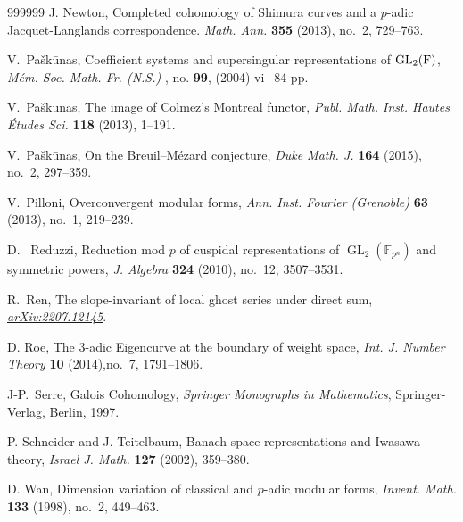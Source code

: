 \documentclass[12pt]{amsart}
\theoremstyle{definition}
\numberwithin{equation}{subsection}
\def\FF{\mathbb{F}}
\DeclareMathOperator{\GL}{GL}
\begin{document}
\begin{thebibliography}{999999}
J. Newton, Completed cohomology of Shimura curves and a $p$-adic
Jacquet-Langlands correspondence. {\it Math. Ann.} {\bf 355} (2013),
no.~2, 729--763.

V.~Pa\v sk\=unas, Coefficient systems and supersingular representations
of $\rm{GL}_2(F)$, \textit{M\'{e}m. Soc. Math. Fr. (N.S.)} , no. {\bf99},
(2004) vi+84 pp. 

V.~Pa\v sk\=unas,
The image of Colmez’s Montreal functor, {\it Publ. Math. Inst. Hautes
\'Etudes Sci.} {\bf 118} (2013), 1--191.

V.~Pa\v sk\=unas, On the Breuil--M\'ezard conjecture, {\it Duke Math. J.} {\bf 164} (2015), no.~2, 297--359.

V.~Pilloni, Overconvergent modular forms, \textit{Ann. Inst. Fourier (Grenoble)} \textbf{63} (2013), no.~1, 219--239.



D. ~Reduzzi, Reduction mod $p$ of cuspidal representations of
$\GL_2(\FF_{p^n})$ and symmetric powers, \textit{J. Algebra}
\textbf{324} (2010), no.~12, 3507--3531.

R.~Ren, The slope-invariant of local ghost series under direct sum, {\it \href{https://arxiv.org/pdf/2207.12145.pdf}{arXiv:2207.12145}}.


D. Roe, The $3$-adic Eigencurve at the boundary of weight space, {\it Int. J. Number Theory} {\bf10} (2014),no.~7, 1791--1806.


J-P.~Serre, Galois Cohomology, {\it Springer Monographs in Mathematics}, Springer-Verlag, Berlin, 1997. 


P. Schneider and J. Teitelbaum,
Banach space representations and Iwasawa theory, {\it Israel J. Math.} {\bf 127} (2002), 359--380.

D. Wan, Dimension variation of classical and $p$-adic modular forms, {\it Invent.
Math.} {\bf 133} (1998), no.~2, 449--463.

\end{thebibliography}
\end{document}
